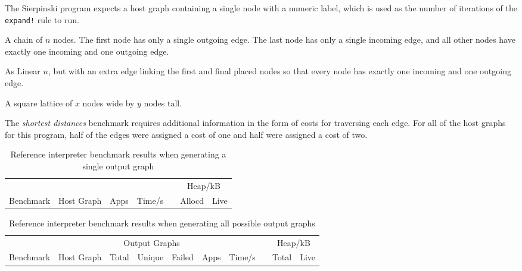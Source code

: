 \begin{description}
	\setlength\itemsep{-0.2em}
	\item[Gen $n$] The Sierpinski program expects a host graph containing a single node with a numeric label, which is used as the number of iterations of the \texttt{expand!} rule to run.

	\item[Linear $n$] A chain of $n$ nodes. The first node has only a single outgoing edge. The last node has only a single incoming edge, and all other nodes have exactly one incoming and one outgoing edge.

	\item[Cyclic $n$] As Linear $n$, but with an extra edge linking the first and final placed nodes so that every node has exactly one incoming and one outgoing edge.

	\item[$x \times y$ Grid] A square lattice of $x$ nodes wide by $y$ nodes tall.
\end{description}

The \textit{shortest distances} benchmark requires additional information in the form of costs for traversing each edge. For all of the host graphs for this program, half of the edges were assigned a cost of one and half were assigned a cost of two.




\begin{table}[h]
\begin{minipage}{\textwidth}
\centering

\begin{tabular}{llrrcrr}
\hline 
&  & & & & \multicolumn{2}{c}{Heap/kB}\\
Benchmark          & Host Graph\footnotemark & Apps & Time/s   & & Allocd & Live \\
\hline 

\end{tabular}

\caption[Reference interpreter benchmarks]{Reference interpreter benchmark results when generating a single output graph}

\label{table:resultsSingle}
\end{minipage}
\end{table}



\begin{table}[h]
\begin{minipage}{\textwidth}
\centering

\begin{tabular}{llrrrrrcrr}
\hline 
&  & \multicolumn{3}{c}{Output Graphs} & & && \multicolumn{2}{c}{Heap/kB}\\
Benchmark          & Host Graph\footnotemark & Total & Unique   & Failed & Apps & Time/s   & & Total  & Live \\
\hline 

\end{tabular}

\caption[Reference interpreter benchmarks]{Reference interpreter benchmark results when generating all possible output graphs}

\label{table:resultsAll}
\end{minipage}
\end{table}


